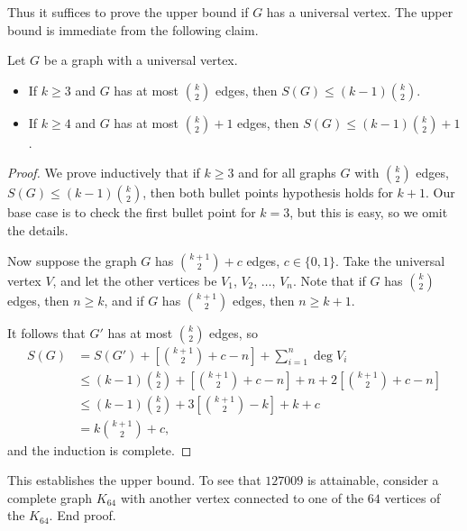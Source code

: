 Thus it suffices to prove the upper bound if $G$ has a universal vertex. The upper bound is immediate from the following claim.
\begin{iclaim}
    Let $G$ be a graph with a universal vertex.
    \begin{itemize}
        \item If $k\ge3$ and $G$ has at most $\binom k2$ edges, then $S(G)\le(k-1)\binom k2$.
        \item If $k\ge4$ and $G$ has at most $\binom k2+1$ edges, then $S(G)\le(k-1)\binom k2+1$.
    \end{itemize}
\end{iclaim}
\begin{proof}
    We prove inductively that if $k\ge3$ and for all graphs $G$ with $\binom k2$ edges, $S(G)\le(k-1)\binom k2$, then both bullet points hypothesis holds for $k+1$. Our base case is to check the first bullet point for $k=3$, but this is easy, so we omit the details.

    Now suppose the graph $G$ has $\binom{k+1}2+c$ edges, $c\in\{0,1\}$. Take the universal vertex $V$, and let the other vertices be $V_1$, $V_2$, $\ldots$, $V_n$. Note that if $G$ has $\binom k2$ edges, then $n\ge k$, and if $G$ has $\binom{k+1}2$ edges, then $n\ge k+1$.

    It follows that $G'$ has at most $\binom k2$ edges, so
    \begin{align*}
        S(G)&=S(G')+\left[\binom{k+1}2+c-n\right]+\sum_{i=1}^n\deg V_i\\
        &\le(k-1)\binom k2+\left[\binom{k+1}2+c-n\right]+n+2\left[\binom{k+1}2+c-n\right]\\
        &\le(k-1)\binom k2+3\left[\binom{k+1}2-k\right]+k+c\\
        &=k\binom{k+1}2+c,
    \end{align*}
    and the induction is complete.
\end{proof}

This establishes the upper bound. To see that $127009$ is attainable, consider a complete graph $K_{64}$ with another vertex connected to one of the $64$ vertices of the $K_{64}$. End proof.

